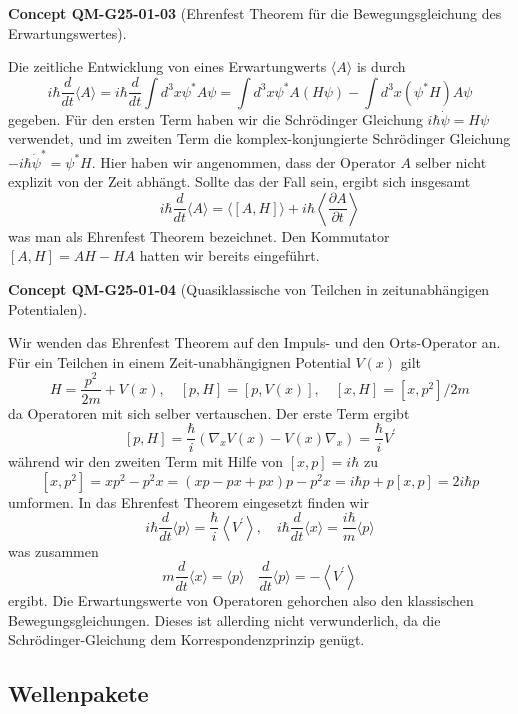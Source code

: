 \documentclass[10pt, letterpaper]{article}
\newcommand{\CustomHeading}[3]{%
  \par\medskip\noindent%
  \textbf{#1 #2} \textnormal{(#3)}.\enskip%
}
\newenvironment{CONC}[2]{\CustomHeading{Concept}{#1}{#2}}{}
\begin{document}
\begin{CONC}{QM-G25-01-03}{Ehrenfest Theorem für die Bewegungsgleichung des Erwartungswertes}
Die zeitliche Entwicklung von eines Erwartungwerts $\langle A\rangle$ is durch
$$
i \hbar \frac{d}{d t}\langle A\rangle=i \hbar \frac{d}{d t} \int d^{3} x \psi^{*} A \psi=\int d^{3} x \psi^{*} A(H \psi)-\int d^{3} x\left(\psi^{*} H\right) A \psi
$$
gegeben. Für den ersten Term haben wir die Schrödinger Gleichung $i \hbar \dot{\psi}=H \psi$ verwendet, und im zweiten Term die komplex-konjungierte Schrödinger Gleichung $-i \hbar \dot{\psi}^{*}=\psi^{*} H$. Hier haben wir angenommen, dass der Operator $A$ selber nicht explizit von der Zeit abhängt. Sollte das der Fall sein, ergibt sich insgesamt
$$
i \hbar \frac{d}{d t}\langle A\rangle=\langle[A, H]\rangle+i \hbar\left\langle\frac{\partial A}{\partial t}\right\rangle
$$
was man als Ehrenfest Theorem bezeichnet. Den Kommutator $[A, H]=A H-H A$ hatten wir bereits eingeführt.
\end{CONC}

\begin{CONC}{QM-G25-01-04}{Quasiklassische von Teilchen in zeitunabhängigen Potentialen}
Wir wenden das Ehrenfest Theorem auf den Impuls- und den Orts-Operator an. Für ein Teilchen in einem Zeit-unabhängignen Potential $V(x)$ gilt
$$
H=\frac{p^{2}}{2 m}+V(x), \quad[p, H]=[p, V(x)], \quad[x, H]=\left[x, p^{2}\right] / 2 m
$$
da Operatoren mit sich selber vertauschen. Der erste Term ergibt
$$
[p, H]=\frac{\hbar}{i}\left(\nabla_{x} V(x)-V(x) \nabla_{x}\right)=\frac{\hbar}{i} V^{\prime}
$$
während wir den zweiten Term mit Hilfe von $[x, p]=i \hbar$ zu
$$
\left[x, p^{2}\right]=x p^{2}-p^{2} x=(x p-p x+p x) p-p^{2} x=i \hbar p+p[x, p]=2 i \hbar p
$$
umformen. In das Ehrenfest Theorem eingesetzt finden wir
$$
i \hbar \frac{d}{d t}\langle p\rangle=\frac{\hbar}{i}\left\langle V^{\prime}\right\rangle, \quad i \hbar \frac{d}{d t}\langle x\rangle=\frac{i \hbar}{m}\langle p\rangle
$$
was zusammen
$$
m \frac{d}{d t}\langle x\rangle=\langle p\rangle \quad \frac{d}{d t}\langle p\rangle=-\left\langle V^{\prime}\right\rangle
$$
ergibt. Die Erwartungswerte von Operatoren gehorchen also den klassischen Bewegungsgleichungen. Dieses ist allerding nicht verwunderlich, da die Schrödinger-Gleichung dem Korrespondenzprinzip genügt.
\end{CONC}

\subsection{Wellenpakete}
\end{document}

